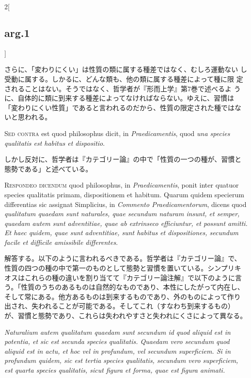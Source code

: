 \documentclass[paper=a4paper,fontsize=10pt,jafontsize=9pt,titlepage]{jlreq}
\begin{document}
\begin{paracol}{2}[\subsection{arg.1}]
\switchcolumn

さらに、「変わりにくい」は性質の類に属する種差ではなく、むしろ運動ない
し受動に属する。しかるに、どんな類も、他の類に属する種差によって種に限
定されることはない。そうではなく、哲学者が『形而上学』第7巻で述べるよ
うに、自体的に類に到来する種差によってなければならない。ゆえに、習慣は
「変わりにくい性質」であると言われるのだから、性質の限定された種ではな
いと思われる。

\switchcolumn*[\subsection{s.c.}]

{\scshape Sed contra} est quod philosophus dicit, in {\itshape Praedicamentis}, quod {\itshape una
species qualitatis est habitus et dispositio}.

\switchcolumn

しかし反対に、哲学者は『カテゴリー論』の中で「性質の一つの種が、習慣と
態勢である」と述べている。


{\scshape Respondeo dicendum} quod philosophus, in {\itshape Praedicamentis}, ponit inter
quatuor species qualitatis primam, dispositionem et habitum. Quarum
quidem specierum differentias sic assignat Simplicius, in {\itshape Commento
Praedicamentorum}, dicens quod {\itshape qualitatum quaedam sunt naturales, quae
secundum naturam insunt, et semper, quaedam autem sunt adventitiae,
quae ab extrinseco efficiuntur, et possunt amitti. Et haec quidem,
quae sunt adventitiae, sunt habitus et dispositiones, secundum facile
et difficile amissibile differentes}.

\switchcolumn

解答する。以下のように言われるべきである。哲学者は『カテゴリー論』で、
性質の四つの種の中で第一のものとして態勢と習慣を置いている。シンプリキ
オスはこれらの種の違いを割り当てて『カテゴリー論注解』で以下のように言
う。「性質のうちのあるものは自然的なものであり、本性にしたがって内在し、
そして常にある。他方あるものは到来するものであり、外のものによって作り
出され、失われることが可能である。そしてこれ（すなわち到来するもの）
が、習慣と態勢であり、これらは失われやすさと失われにくさによって異なる。

\switchcolumn*

{\itshape Naturalium autem qualitatum
quaedam sunt secundum id quod aliquid est in potentia, et sic est
secunda species qualitatis. Quaedam vero secundum quod aliquid est in
actu, et hoc vel in profundum, vel secundum superficiem. Si in
profundum quidem, sic est tertia species qualitatis, secundum vero
superficiem, est quarta species qualitatis, sicut figura et forma,
quae est figura animati.}


\end{paracol}
\end{document}

